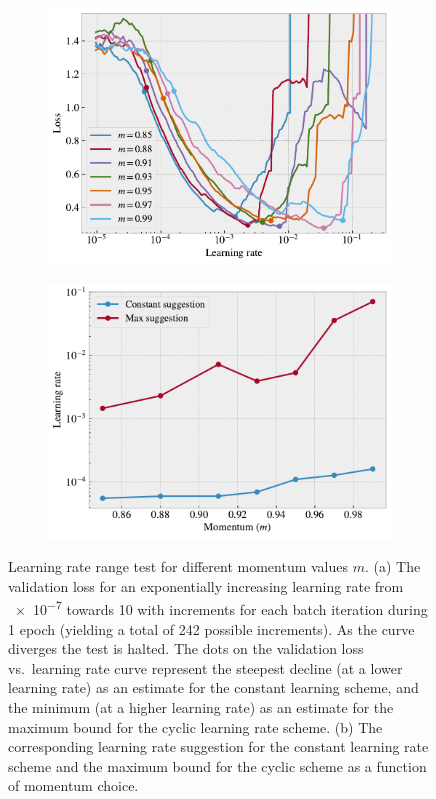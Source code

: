 \begin{figure}[!htb]
  \centering
  \begin{subfigure}[t]{0.49\textwidth}
      \centering
      \includegraphics[width=\textwidth]{figures/ML/LR_momentum_test_a.pdf}
      \caption{}
  \end{subfigure}
  \hfill
  \begin{subfigure}[t]{0.49\textwidth}
      \centering
      \includegraphics[width=\textwidth]{figures/ML/LR_momentum_test_b.pdf}
      \caption{}
  \end{subfigure}
  \hfill
  \caption{Learning rate range test for different momentum values $m$. (a) The validation loss for an exponentially increasing learning rate from \num{e-7} towards 10 with increments for each batch iteration during 1 epoch (yielding a total of 242 possible increments). As the curve diverges the test is halted. The dots on the validation loss vs.\ learning rate curve represent the steepest decline (at a lower learning rate) as an estimate for the constant learning scheme, and the minimum (at a higher learning rate) as an estimate for the maximum bound for the cyclic learning rate scheme. (b) The corresponding learning rate suggestion for the constant learning rate scheme and the maximum bound for the cyclic scheme as a function of momentum choice. }
  \label{fig:LR_range_mom}
\end{figure}


